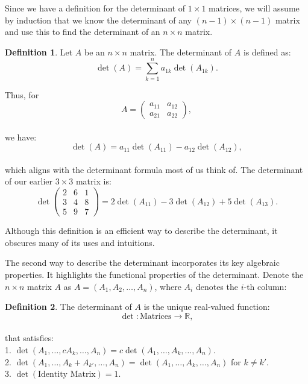 \documentclass[
]{book}
\theoremstyle{definition}
\newtheorem{definition}{Definition}[chapter]
\theoremstyle{definition}
\theoremstyle{definition}
\theoremstyle{definition}
\theoremstyle{remark}
\begin{document}
Since we have a definition for the determinant of \(1 \times 1\) matrices, we will assume by induction that we know the determinant of any \((n - 1) \times (n - 1)\) matrix and use this to find the determinant of an \(n \times n\) matrix.

\begin{definition}
Let \(A\) be an \(n \times n\) matrix. The determinant of \(A\) is defined as:\\
\[ \det(A) = \sum_{k=1}^n a_{1k} \det(A_{1k}). \]
\end{definition}

Thus, for\\
\[ A = 
\begin{pmatrix} 
a_{11} & a_{12} \\ 
a_{21} & a_{22} 
\end{pmatrix}, 
\]\\
we have:\\
\[ \det(A) = a_{11} \det(A_{11}) - a_{12} \det(A_{12}), \]\\
which aligns with the determinant formula most of us think of. The determinant of our earlier \(3 \times 3\) matrix is:\\
\[ \det
\begin{pmatrix} 
2 & 6 & 1 \\ 
3 & 4 & 8 \\ 
5 & 9 & 7 
\end{pmatrix} 
= 2 \det(A_{11}) - 3 \det(A_{12}) + 5 \det(A_{13}). \]

Although this definition is an efficient way to describe the determinant, it obscures many of its uses and intuitions.

The second way to describe the determinant incorporates its key algebraic properties. It highlights the functional properties of the determinant. Denote the \(n \times n\) matrix \(A\) as \(A = (A_1, A_2, \dots, A_n)\), where \(A_i\) denotes the \(i\)-th column:

\begin{definition}
The determinant of \(A\) is the unique real-valued function:\\
\[ \det: \text{Matrices} \to \mathbb{R}, \]\\
that satisfies:\\
1. \(\det(A_1, \dots, c A_k, \dots, A_n) = c \det(A_1, \dots, A_k, \dots, A_n)\).\\
2. \(\det(A_1, \dots, A_k + A_{k'}, \dots, A_n) = \det(A_1, \dots, A_k, \dots, A_n)\) for \(k \neq k'\).\\
3. \(\det(\text{Identity Matrix}) = 1.\)
\end{definition}
\end{document}
